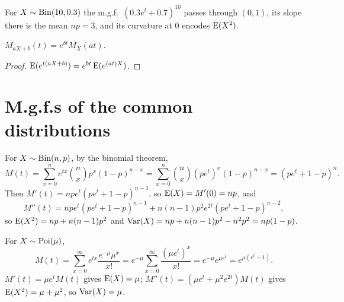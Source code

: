 \begin{center}
\end{center}
For $X\sim\operatorname{Bin}(10,0.3)$ the m.g.f.\ $(0.3e^t+0.7)^{10}$ passes through $(0,1)$, its slope
there is the mean $np = 3$, and its curvature at $0$ encodes $\operatorname{E}(X^2)$.

\begin{theorem}
$M_{aX+b}(t) = e^{bt}M_X(at)$.
\end{theorem}

\begin{proof}
$\operatorname{E}(e^{t(aX+b)}) = e^{bt}\operatorname{E}(e^{(at)X})$.
\end{proof}

\section{M.g.f.s of the common distributions}

\begin{example}[Binomial]
For $X\sim\operatorname{Bin}(n,p)$, by the binomial theorem,
\[
  M(t) = \sum_{x=0}^n e^{tx}\binom nx p^x(1-p)^{n-x} = \sum_{x=0}^n\binom nx(pe^t)^x
  (1-p)^{n-x} = (pe^t + 1 - p)^n.
\]
Then $M'(t) = npe^t(pe^t+1-p)^{n-1}$, so $\operatorname{E}(X) = M'(0) = np$, and
\[
  M''(t) = npe^t(pe^t+1-p)^{n-1} + n(n-1)p^2e^{2t}(pe^t+1-p)^{n-2},
\]
so $\operatorname{E}(X^2) = np + n(n-1)p^2$ and $\operatorname{Var}(X) = np + n(n-1)p^2 - n^2p^2 = np(1-p)$.
\end{example}

\begin{example}[Poisson]
For $X\sim\operatorname{Poi}(\mu)$,
\[
  M(t) = \sum_{x=0}^\infty e^{tx}\frac{e^{-\mu}\mu^x}{x!} = e^{-\mu}\sum_{x=0}^\infty
  \frac{(\mu e^t)^x}{x!} = e^{-\mu}e^{\mu e^t} = e^{\mu(e^t-1)}.
\]
$M'(t) = \mu e^tM(t)$ gives $\operatorname{E}(X) = \mu$; $M''(t) = (\mu e^t + \mu^2e^{2t})M(t)$ gives
$\operatorname{E}(X^2) = \mu+\mu^2$, so $\operatorname{Var}(X) = \mu$.
\end{example}

